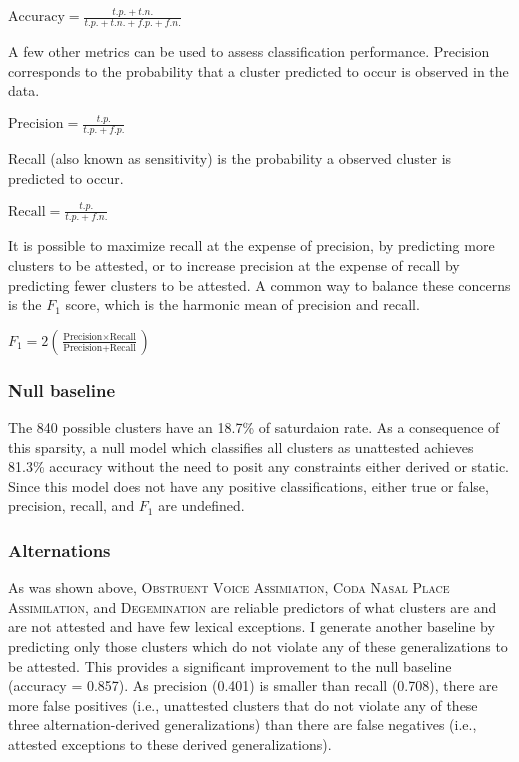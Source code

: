 \begin{example}[Accuracy]
$\displaystyle \textrm{Accuracy} = \frac{t.p. + t.n.}{t.p. + t.n. + f.p. + f.n.}$
\end{example}

\noindent
A few other metrics can be used to assess classification performance. Precision corresponds to the probability that a cluster predicted to occur is observed in the data. 
\begin{example}[exasmple]
$\displaystyle \textrm{Precision} = \frac{t.p.}{t.p. + f.p.}$ 
\end{example}

\noindent
Recall (also known as sensitivity) is the probability a observed cluster is predicted to occur. 

\begin{example}[hi]
$\displaystyle \textrm{Recall} = \frac{t.p.}{t.p. + f.n.}$
\end{example}

It is possible to maximize recall at the expense of precision, by predicting more clusters to be attested, or to increase precision at the expense of recall by predicting fewer clusters to be attested. A common way to balance these concerns is the $F_1$ score, which is the harmonic mean of precision and recall.

\begin{example}[thing]
$\displaystyle F_1 = 2 \left( \frac{\textrm{Precision} \times \textrm{Recall}}{\textrm{Precision} + \textrm{Recall}}\right)$ 
\end{example}

\subsubsection{Null baseline}

The 840 possible clusters have an 18.7\% of saturdaion rate. As a consequence of this sparsity, a null model which classifies all clusters as unattested achieves 81.3\% accuracy without the need to posit any constraints either derived or static. Since this model does not have any positive classifications, either true or false, precision, recall, and $F_1$ are undefined.

\subsubsection{Alternations}

As was shown above, \textsc{Obstruent Voice Assimiation}, \textsc{Coda Nasal Place Assimilation}, and \textsc{Degemination} are reliable predictors of what clusters are and are not attested and have few lexical exceptions. I generate another baseline by predicting only those clusters which do not violate any of these generalizations to be attested. This provides a significant improvement to the null baseline (accuracy = 0.857). As precision (0.401) is smaller than recall (0.708), there are more false positives (i.e., unattested clusters that do not violate any of these three alternation-derived generalizations) than there are false negatives (i.e., attested exceptions to these derived generalizations). 

